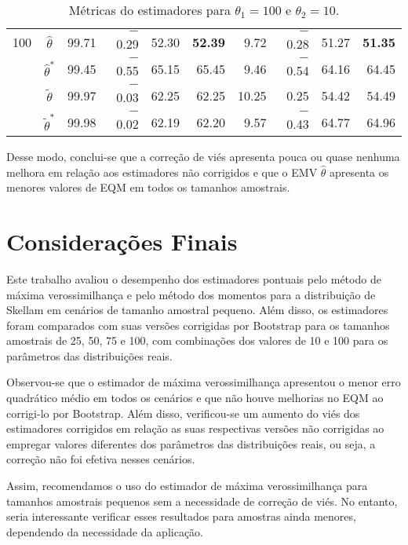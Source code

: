 \documentclass[12pt]{article}
\theoremstyle{definition}
\begin{document}
\begin{table}[htbp]
\begin{tabular}{c|c|rrrr|rrrr}
    \hline
    100 & $\hat{\theta}$ & 99.71 & $-$0.29 & 52.30 & \textbf{52.39} & 9.72 & $-$0.28 & 51.27 & \textbf{51.35} \\ 
        & $\hat{\theta}^*$ & 99.45 & $-$0.55 & 65.15 & 65.45 & 9.46 & $-$0.54 & 64.16 & 64.45 \\ 
        & $\tilde{\theta}$ & 99.97 & $-$0.03 & 62.25 & 62.25 & 10.25 & 0.25 & 54.42 & 54.49 \\ 
        & $\tilde{\theta}^*$ & 99.98 & $-$0.02 & 62.19 & 62.20 & 9.57 & $-$0.43 & 64.77 & 64.96 \\ 
    \hline
\end{tabular}
\caption{Métricas do estimadores para $\theta_1 = 100$ e $\theta_2 = 10$.}
\label{tab:100x10}
\end{table}


Desse modo, conclui-se que a correção de viés apresenta pouca ou quase nenhuma melhora em relação aos estimadores não corrigidos e que o EMV $\hat{\theta}$ apresenta os menores valores de EQM em todos os tamanhos amostrais. 

\section{Considerações Finais}

Este trabalho avaliou o desempenho dos estimadores pontuais pelo método de máxima verossimilhança e pelo método dos momentos para a distribuição de Skellam em cenários de tamanho amostral pequeno. Além disso, os estimadores foram comparados com suas versões corrigidas por Bootstrap para os tamanhos amostrais de 25, 50, 75 e 100, com combinações dos valores de 10 e 100 para os parâmetros das distribuições reais.

Observou-se que o estimador de máxima verossimilhança apresentou o menor erro quadrático médio em todos os cenários e que não houve melhorias no EQM ao corrigi-lo por Bootstrap. Além disso, verificou-se um aumento do viés dos estimadores corrigidos em relação as suas respectivas versões não corrigidas ao empregar valores diferentes dos parâmetros das distribuições reais, ou seja, a correção não foi efetiva nesses cenários.

Assim, recomendamos o uso do estimador de máxima verossimilhança para tamanhos amostrais pequenos sem a necessidade de correção de viés. No entanto, seria interessante verificar esses resultados para amostras ainda menores, dependendo da necessidade da aplicação.


\medskip

\printbibliography
\end{document}
